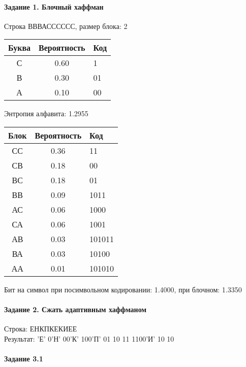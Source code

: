 \documentclass[a4paper, 12pt]{article}
\begin{document}
\paragraph{Задание 1. Блочный хаффман \\}

Строка ВВВАСССССС, размер блока: 2
\begin{center}
 \begin{tabular}{ |c|c|l| } 
  \hline
     Буква & Вероятность & Код\\ \hline
С & 0.60 & 1\\\hline
В & 0.30 & 01\\\hline
А & 0.10 & 00
\\ \hline \end{tabular}
\end{center}
Энтропия алфавита: 1.2955
\begin{center}
 \begin{tabular}{ |c|c|l| } 
  \hline
     Блок & Вероятность & Код\\ \hline
СС & 0.36 & 11\\\hline
СВ & 0.18 & 00\\\hline
ВС & 0.18 & 01\\\hline
ВВ & 0.09 & 1011\\\hline
АС & 0.06 & 1000\\\hline
СА & 0.06 & 1001\\\hline
АВ & 0.03 & 101011\\\hline
ВА & 0.03 & 10100\\\hline
АА & 0.01 & 101010
\\ \hline \end{tabular}
\end{center}
Бит на символ при посимвольном кодировании: 1.4000, при блочном: 1.3350


\pagebreak
\paragraph{Задание 2. Сжать адаптивным хаффманом\\}

Строка: 
ЕНКПКЕКИЕЕ\\
Результат: 'Е' 0'Н' 00'К' 100'П' 01 10 11 1100'И' 10 10










\pagebreak
\paragraph{Задание 3.1}
\end{document}
